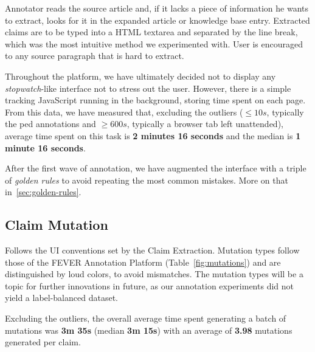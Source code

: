 Annotator reads the source article and, if it lacks a piece of information he wants to extract, looks for it in the expanded article or knowledge base entry. Extracted claims are to be typed into a \textsf{HTML} textarea and separated by the line break, which was the most intuitive method we experimented with. User is encouraged to  any source paragraph that is hard to extract. 

Throughout the platform, we have ultimately decided not to display any \textit{stopwatch}-like interface not to stress out the user. However, there is a simple tracking \textsf{JavaScript} running in the background, storing time spent on each page. From this data, we have measured that, excluding the outliers ($\leq10s$, typically the ped annotations and $\geq 600s$, typically a browser tab left unattended), average time spent on this task is \textbf{2 minutes 16 seconds} and the median is \textbf{1 minute 16 seconds}.

After the first wave of annotation, we have augmented the interface with a triple of \textit{golden rules} to avoid repeating the most common mistakes. More on that in~\ref{sec:golden-rules}.



\subsection{Claim Mutation}
Follows the UI conventions set by the Claim Extraction. Mutation types follow those of the \textsf{FEVER Annotation Platform} (Table~\ref{fig:mutations}) and are distinguished by loud colors, to avoid mismatches. The mutation types will be a topic for further innovations in future, as our annotation experiments did not yield a label-balanced dataset. 

Excluding the outliers, the overall average time spent generating a batch of mutations was \textbf{3m 35s} (median \textbf{3m 15s}) with an average of \textbf{3.98} mutations generated per claim.

